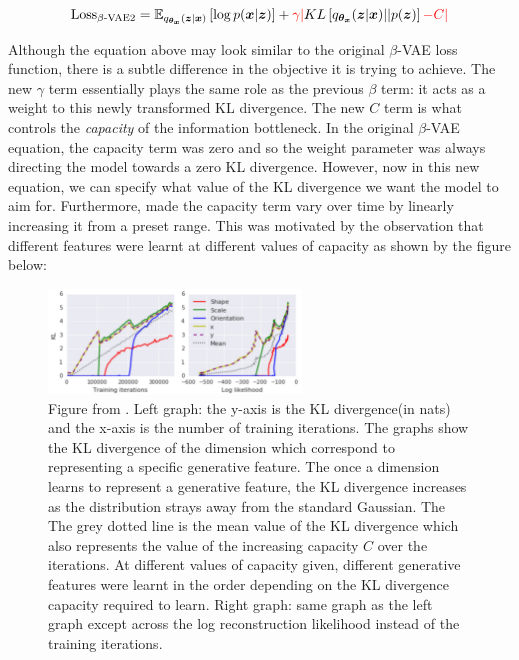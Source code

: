             \begin{equation}
                \text{Loss\textsubscript{$\beta$-VAE2}} = \mathbb{E}_{q_{\bm{\theta_x}}(\bm{z}|\bm{x})} \left[\log p(\bm{x} | \bm{z}) \right] + \textcolor{red}{\gamma} \textcolor{red}{|} KL\left[q_{\bm{\theta_x}}(\bm{z}|\bm{x}) || p(\bm{z})\right] \textcolor{red}{-C} \textcolor{red}{|}
            \end{equation}
            
            Although the equation above may look similar to the original $\beta$-VAE loss function, there is a subtle difference in the objective it is trying to achieve. The new $\gamma$ term essentially plays the same role as the previous $\beta$ term: it acts as a weight to this newly transformed KL divergence. The new $C$ term is what controls the \textit{capacity} of the information bottleneck. In the original $\beta$-VAE equation, the capacity term was zero and so the weight parameter was always directing the model towards a zero KL divergence. However, now in this new equation, we can specify what value of the KL divergence we want the model to aim for. Furthermore, \cite{burgess2018understanding} made the capacity term vary over time by linearly increasing it from a preset range. This was motivated by the observation that different features were learnt at different values of capacity as shown by the figure below:
            
            \begin{figure}[H]
                \centering
                \includegraphics[width=0.6\textwidth]{imgs/features_capacity.png}
                \caption{Figure from \cite{burgess2018understanding}. Left graph: the y-axis is the KL divergence(in nats) and the x-axis is the number of training iterations. The graphs show the KL divergence of the dimension which correspond to representing a specific generative feature. The once a dimension learns to represent a generative feature, the KL divergence increases as the distribution strays away from the standard Gaussian. The The grey dotted line is the mean value of the KL divergence which also represents the value of the increasing capacity $C$ over the iterations. At different values of capacity given, different generative features were learnt in the order depending on the KL divergence capacity required to learn. Right graph: same graph as the left graph except across the log reconstruction likelihood instead of the training iterations.}
                \label{fig:features_capacity}
            \end{figure}
            

